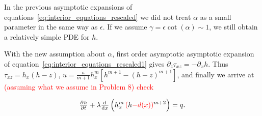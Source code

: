 In the previous asymptotic expansions of equations~\eqref{eq:interior_equations_rescaled} we did not treat $\alpha$ as a small parameter in the same way as $\epsilon$. If we assume $\gamma = \epsilon \cot(\alpha) \sim 1$, we still obtain a relatively simple PDE for $h$.

With the new assumption about $\alpha$, first order asymptotic asymptotic expansion of equation~\eqref{eq:interior_equations_rescaled1} gives $\partial_z \tau_{xz} = - \partial_x h$. Thus $\tau_{xz} = h_x (h-z)$, $u = \frac{\kappa}{m+1} h_x^m \left[ h^{m+1} - (h-z)^{m+1} \right]$, and finally we arrive at \textcolor{red}{(assuming what we assume in Problem 8) check}

\begin{equation}
\pd{h}{t} + \lambda \od{}{x} \left(h_x^m \, \red{(}h\red{-d(x))}^{m+2}\right) = q.
\end{equation}

